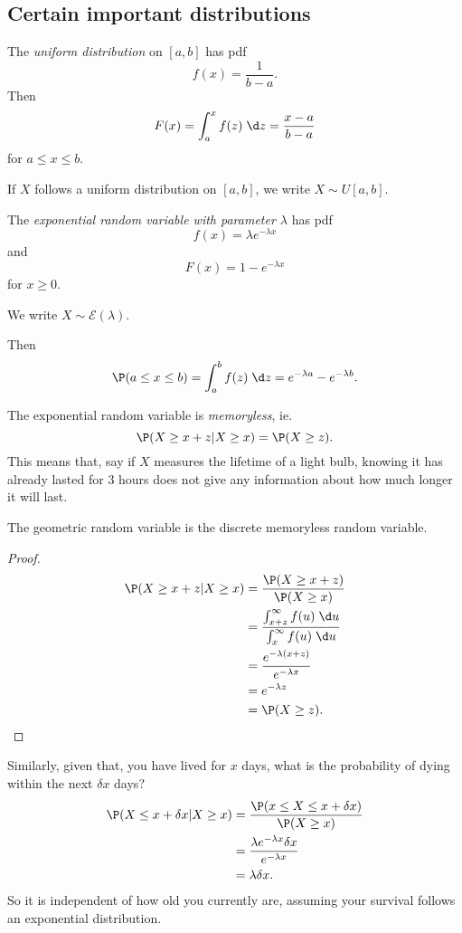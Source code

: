 \documentclass[a4paper]{article}
\begin{document}
\subsection{Certain important distributions}
\begin{defi}
  The \emph{uniform distribution} on $[a, b]$ has pdf
  \[
    f(x) = \frac{1}{b - a}.
  \]
  Then
  \[
    F(x) = \int_a^x f(z)\;\d z = \frac{x - a}{b - a}
  \]
  for $a \leq x \leq b$.

  If $X$ follows a uniform distribution on $[a, b]$, we write $X\sim U[a, b]$.
\end{defi}
\begin{defi}
  The \emph{exponential random variable with parameter $\lambda$} has pdf
  \[
    f(x) = \lambda e^{-\lambda x}
  \]
  and
  \[
    F(x) = 1 - e^{-\lambda x}
  \]
  for $x \geq 0$.

  We write $X \sim \mathcal{E}(\lambda)$.
\end{defi}

Then
\[
  \P(a \leq x \leq b) = \int_a^b f(z) \;\d z = e^{-\lambda a} - e^{-\lambda b}.
\]
\begin{prop}
  The exponential random variable is \emph{memoryless}, ie.
  \[
    \P(X \geq x + z | X \geq x) = \P(X \geq z).
  \]
  This means that, say if $X$ measures the lifetime of a light bulb, knowing it has already lasted for 3 hours does not give any information about how much longer it will last.
\end{prop}
\note The geometric random variable is the discrete memoryless random variable.

\begin{proof}
  \begin{align*}
    \P(X \geq x + z | X \geq x) &= \frac{\P(X \geq x + z)}{\P(X \geq x)}\\
    &= \frac{\int_{x + z}^\infty f(u)\;\d u}{\int_x^\infty f(u)\;\d u}\\
    &= \frac{e^{-\lambda(x + z)}}{e^{-\lambda x}}\\
    &= e^{-\lambda z}\\
    &= \P(X \geq z).
  \end{align*}
\end{proof}

Similarly, given that, you have lived for $x$ days, what is the probability of dying within the next $\delta x$ days?
\begin{align*}
  \P(X \leq x + \delta x | X \geq x) &= \frac{\P(x \leq X \leq x + \delta x)}{\P(X \geq x)}\\
  &= \frac{\lambda e^{-\lambda x} \delta x}{e^{-\lambda x}}\\
  &= \lambda \delta x.
\end{align*}
So it is independent of how old you currently are, assuming your survival follows an exponential distribution.
\end{document}
